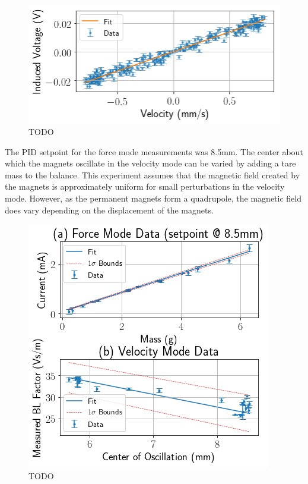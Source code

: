 \documentclass[aps,prstab,reprint,12pt]{revtex4-1}
\begin{document}
\begin{figure}[t]
    \centering
    \includegraphics[width=0.95\linewidth]{figs/data/velocity_data_example.png}
    \caption{TODO}
    \label{fig:velocity-example}
\end{figure}

The PID setpoint for the force mode measurements was 8.5mm. The center about which the magnets oscillate in the velocity mode can be varied by adding a tare mass to the balance. This experiment assumes that the magnetic field created by the magnets is approximately uniform for small perturbations in the velocity mode. However, as the permanent magnets form a quadrupole, the magnetic field does vary depending on the displacement of the magnets.

\begin{figure}[t]
    \centering
    \includegraphics[width=\linewidth]{figs/data/final_data.png}
    \caption{TODO}
    \label{fig:both-data}
\end{figure}
\end{document}

